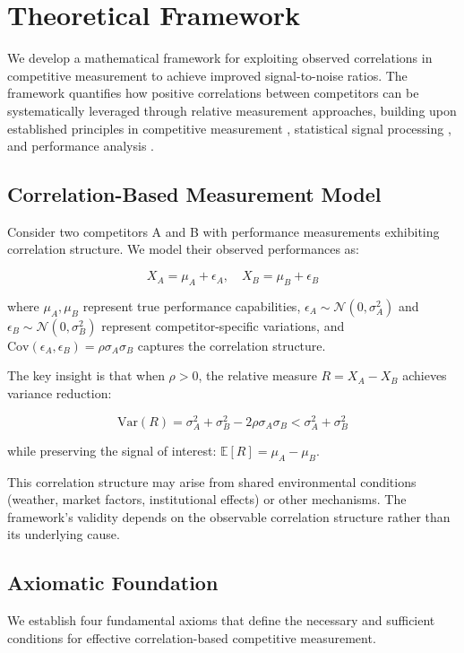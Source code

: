 \section{Theoretical Framework}

We develop a mathematical framework for exploiting observed correlations in competitive measurement to achieve improved signal-to-noise ratios. The framework quantifies how positive correlations between competitors can be systematically leveraged through relative measurement approaches, building upon established principles in competitive measurement \cite{keiningham2015competitive}, statistical signal processing \cite{boll1979suppression}, and performance analysis \cite{hughes2002performance}.

\subsection{Correlation-Based Measurement Model}

Consider two competitors A and B with performance measurements exhibiting correlation structure. We model their observed performances as:

$$X_A = \mu_A + \epsilon_A, \quad X_B = \mu_B + \epsilon_B$$

where $\mu_A, \mu_B$ represent true performance capabilities, $\epsilon_A \sim \mathcal{N}(0, \sigma_A^2)$ and $\epsilon_B \sim \mathcal{N}(0, \sigma_B^2)$ represent competitor-specific variations, and $\text{Cov}(\epsilon_A, \epsilon_B) = \rho\sigma_A\sigma_B$ captures the correlation structure.

The key insight is that when $\rho > 0$, the relative measure $R = X_A - X_B$ achieves variance reduction:

$$\text{Var}(R) = \sigma_A^2 + \sigma_B^2 - 2\rho\sigma_A\sigma_B < \sigma_A^2 + \sigma_B^2$$

while preserving the signal of interest: $\mathbb{E}[R] = \mu_A - \mu_B$.

This correlation structure may arise from shared environmental conditions (weather, market factors, institutional effects) or other mechanisms. The framework's validity depends on the observable correlation structure rather than its underlying cause.

\subsection{Axiomatic Foundation}

We establish four fundamental axioms that define the necessary and sufficient conditions for effective correlation-based competitive measurement.

